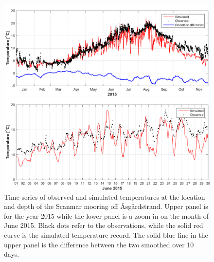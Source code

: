 \begin{figure}[htb]
	\centerline{ \includegraphics*[trim=0cm 0cm 0cm 0cm,clip=true,width=\textwidth]{Figurer/Temperatur_2015} }
	\centerline{ \includegraphics*[trim=0cm 0cm 0cm 0cm,clip=true,width=\textwidth]{Figurer/Temperatur_jun2015} }
	\caption{\small Time series of observed and simulated temperatures at the location and depth of the Scanmar mooring off {\AA}sg{\aa}rdstrand. Upper panel is for the year 2015 while the lower panel is a zoom in on the month of June 2015. Black dots refer to the observations, while the solid red curve is the simulated temperature record. The solid blue line in the upper panel is the difference between the two smoothed over 10 days.}
	\label{fig:temp_2015}
\end{figure}

